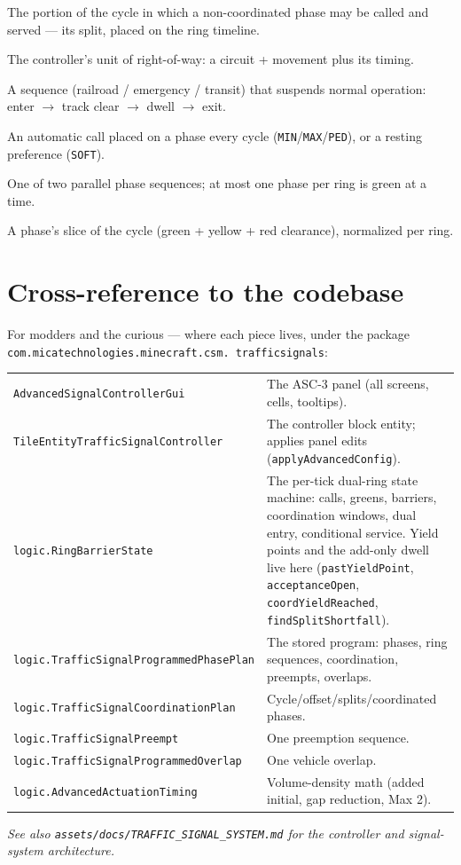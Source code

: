 \documentclass[11pt]{article}
\begin{document}
\begin{description}[nosep,leftmargin=4.2cm,style=nextline]
  \item[Permissive window] The portion of the cycle in which a non-coordinated
    phase may be called and served — its split, placed on the ring timeline.
  \item[Phase] The controller's unit of right-of-way: a circuit + movement plus
    its timing.
  \item[Preemption] A sequence (railroad / emergency / transit) that suspends
    normal operation: enter $\to$ track clear $\to$ dwell $\to$ exit.
  \item[Recall] An automatic call placed on a phase every cycle
    (\texttt{MIN}/\texttt{MAX}/\texttt{PED}), or a resting preference
    (\texttt{SOFT}).
  \item[Ring] One of two parallel phase sequences; at most one phase per ring is
    green at a time.
  \item[Split] A phase's slice of the cycle (green + yellow + red clearance),
    normalized per ring.
\end{description}

\section{Cross-reference to the codebase}\label{sec:code}

For modders and the curious — where each piece lives, under the package
\texttt{com.micatechnologies.\allowbreak minecraft.\allowbreak csm.\allowbreak
trafficsignals}:

\begin{center}\small
\begin{tabular}{@{}lp{8.4cm}@{}}
\toprule
\texttt{AdvancedSignalControllerGui} & The ASC-3 panel (all screens, cells, tooltips). \\
\texttt{TileEntityTrafficSignalController} & The controller block entity; applies
  panel edits (\texttt{applyAdvancedConfig}). \\
\texttt{logic.RingBarrierState} & The per-tick dual-ring state machine: calls,
  greens, barriers, coordination windows, dual entry, conditional service. Yield
  points and the add-only dwell live here (\texttt{pastYieldPoint},
  \texttt{acceptanceOpen}, \texttt{coordYieldReached},
  \texttt{findSplitShortfall}). \\
\texttt{logic.TrafficSignalProgrammedPhasePlan} & The stored program: phases, ring
  sequences, coordination, preempts, overlaps. \\
\texttt{logic.TrafficSignalCoordinationPlan} & Cycle/offset/splits/coordinated
  phases. \\
\texttt{logic.TrafficSignalPreempt} & One preemption sequence. \\
\texttt{logic.TrafficSignalProgrammedOverlap} & One vehicle overlap. \\
\texttt{logic.AdvancedActuationTiming} & Volume-density math (added initial, gap
  reduction, Max 2). \\
\bottomrule
\end{tabular}
\end{center}

\vspace{6mm}
\begin{center}
\small\itshape See also \texttt{assets/docs/TRAFFIC\_SIGNAL\_SYSTEM.md} for the
controller and signal-system architecture.
\end{center}
\end{document}
